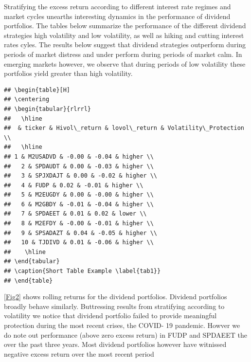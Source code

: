 \documentclass[12pt,preprint, authoryear]{elsarticle}
\let\origtable\table
\let\endorigtable\endtable
\renewenvironment{table}[1][2] {
    \expandafter\origtable\expandafter[H]
} {
    \endorigtable
}
\numberwithin{equation}{section}
\numberwithin{figure}{section}
\numberwithin{table}{section}
\begin{document}
Stratifying the excess return according to different interest rate
regimes and market cycles unearths interesting dynamics in the
performance of dividend portfolios. The tables below summarize the
performance of the different dividend strategies high volatility and low
volatility, as well as hiking and cutting interest rates cyles. The
results below suggest that dividend strategies outperform during periods
of market distress and under perform during periods of market calm. In
emerging markets however, we observe that during periods of low
volatility these portfolios yield greater than high volatility.

\begin{verbatim}
## \begin{table}[H]
## \centering
## \begin{tabular}{rlrrl}
##   \hline
##  & ticker & Hivol\_return & lovol\_return & Volatility\_Protection \\ 
##   \hline
## 1 & M2USADVD & -0.00 & -0.04 & higher \\ 
##   2 & SPDAUDT & 0.00 & -0.03 & higher \\ 
##   3 & SPJXDAJT & 0.00 & -0.02 & higher \\ 
##   4 & FUDP & 0.02 & -0.01 & higher \\ 
##   5 & M2EUGDY & 0.00 & -0.00 & higher \\ 
##   6 & M2GBDY & -0.01 & -0.04 & higher \\ 
##   7 & SPDAEET & 0.01 & 0.02 & lower \\ 
##   8 & M2EFDY & -0.00 & -0.01 & higher \\ 
##   9 & SPSADAZT & 0.04 & -0.05 & higher \\ 
##   10 & TJDIVD & 0.01 & -0.06 & higher \\ 
##    \hline
## \end{tabular}
## \caption{Short Table Example \label{tab1}} 
## \end{table}
\end{verbatim}

\ref{Fig2} shows rolling returns for the dividend portfolios. Dividend
portfolios broadly behave similarly. Buttressing results from
stratifying according to volatility we notice that dividend portfolio
failed to provide meaningful protection during the most recent crises,
the COVID- 19 pandemic. Howver we do note out performance (above zero
excess return) in FUDP and SPDAEET the over the past three years. Most
dividend portfolios however have witnissed negative excess return over
the most recent period
\end{document}
